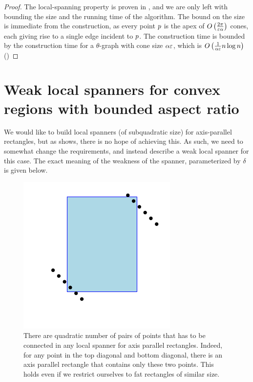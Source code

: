 \documentclass[12pt]{article}%
\begin{document}
\begin{proof}
    The local-spanning property is proven in
    , and we are only left with bounding
    the size and the running time of the algorithm. The bound on the
    size is immediate from the construction, as every point $p$ is
    the apex of $O\left( \frac{2\pi}{\varepsilon\alpha} \right)$ cones, each
    giving rise to a single edge incident to $p$.  The construction
    time is bounded by the construction time for a $\theta$-graph with
    cone size $\alpha\varepsilon$, which is
    $O\left(\frac{1}{\alpha\varepsilon}n\log n\right)$ (\cite{c-aaspmp-87})
\end{proof}






\section{Weak local spanners for convex regions %
   with bounded aspect ratio}

We would like to build local spanners (of subquadratic size) for
axis-parallel rectangles, but as  shows, there
is no hope of achieving this. As such, we need to somewhat change the
requirements, and instead describe a weak local spanner for this case.
The exact meaning of the weakness of the spanner, parameterized by
$\delta$ is given below.

\begin{figure}
    \centerline{\includegraphics{figs/local_rectangles}}
    \caption{There are quadratic number of pairs of points that has to
       be connected in any local spanner for axis parallel
       rectangles. Indeed, for any point in the top diagonal and
       bottom diagonal, there is an axis parallel rectangle that
       contains only these two points. This holds even if we restrict
       ourselves to fat rectangles of similar size.}
\end{figure}
\end{document}
